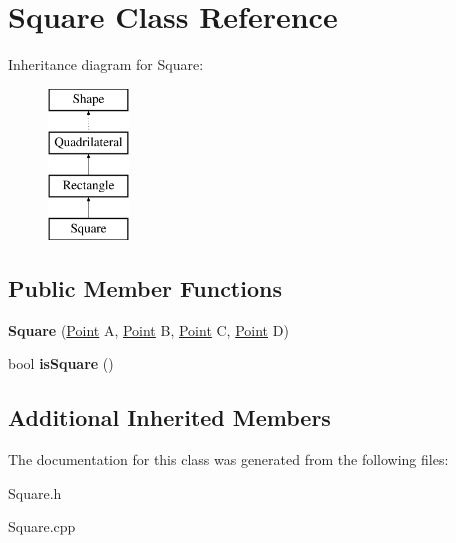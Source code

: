 \hypertarget{class_square}{}\section{Square Class Reference}
\label{class_square}
Inheritance diagram for Square\+:\begin{figure}[H]
\begin{center}
\leavevmode
\includegraphics[height=4.000000cm]{class_square}
\end{center}
\end{figure}
\subsection*{Public Member Functions}
\begin{DoxyCompactItemize}
\item 
\mbox{\label{class_square_a6409d9c1c814024d6450ceeeeee7865c}} 
{\bfseries Square} (\mbox{\hyperlink{class_point}{Point}} A, \mbox{\hyperlink{class_point}{Point}} B, \mbox{\hyperlink{class_point}{Point}} C, \mbox{\hyperlink{class_point}{Point}} D)
\item 
\mbox{\label{class_square_a515c5d44b0238e4bad632aeefc92ebab}} 
bool {\bfseries is\+Square} ()
\end{DoxyCompactItemize}
\subsection*{Additional Inherited Members}


The documentation for this class was generated from the following files\+:\begin{DoxyCompactItemize}
\item 
Square.\+h\item 
Square.\+cpp\end{DoxyCompactItemize}
